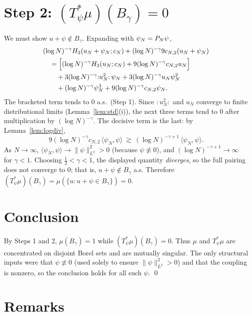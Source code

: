 \section*{Step 2: $(T_\psi^*\mu)(B_\gamma)=0$}

We must show $u+\psi\notin B_\gamma$. Expanding with $\psi_N=P_N\psi$,
\begin{align*}
&(\log N)^{-\gamma}H_3(u_N+\psi_N;c_N)+(\log N)^{-\gamma}9c_{N,2}(u_N+\psi_N)\\
&\quad=\Bigl[(\log N)^{-\gamma}H_3(u_N;c_N)+9(\log N)^{-\gamma}c_{N,2}u_N\Bigr]\\
&\qquad+3(\log N)^{-\gamma}{:}u_N^2{:}\,\psi_N+3(\log N)^{-\gamma}u_N\psi_N^2\\
&\qquad+(\log N)^{-\gamma}\psi_N^3+9(\log N)^{-\gamma}c_{N,2}\psi_N.
\end{align*}
The bracketed term tends to $0$ a.s.\ (Step 1). Since ${:}u_N^2{:}$ and $u_N$
converge to finite distributional limits (Lemma~\ref{lem:std}(i)), the next three
terms tend to $0$ after multiplication by $(\log N)^{-\gamma}$. The decisive term
is the last: by Lemma~\ref{lem:logdiv},
\[
9(\log N)^{-\gamma}c_{N,2}\,\langle\psi_N,\psi\rangle\ \gtrsim\ (\log N)^{-\gamma+1}\,\langle\psi_N,\psi\rangle .
\]
As $N\to\infty$, $\langle\psi_N,\psi\rangle\to\|\psi\|_{L^2}^2>0$ (because
$\psi\not\equiv0$), and $(\log N)^{-\gamma+1}\to\infty$ for $\gamma<1$. Choosing
$\tfrac12<\gamma<1$, the displayed quantity \emph{diverges}, so the full pairing
does not converge to $0$; that is, $u+\psi\notin B_\gamma$ a.s. Therefore
$(T_\psi^*\mu)(B_\gamma)=\mu(\{u:u+\psi\in B_\gamma\})=0$.

\section*{Conclusion}

By Steps 1 and 2, $\mu(B_\gamma)=1$ while $(T_\psi^*\mu)(B_\gamma)=0$. Thus $\mu$
and $T_\psi^*\mu$ are concentrated on disjoint Borel sets and are mutually
singular. The only structural inputs were that $\psi\not\equiv0$ (used solely to
ensure $\|\psi\|_{L^2}^2>0$) and that the coupling is nonzero, so the conclusion
holds for all such $\psi$. \qed

\section*{Remarks}

